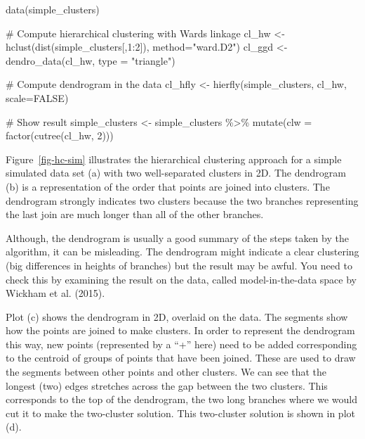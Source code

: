 \documentclass[
  letterpaper,
]{krantz}
\newenvironment{Shaded}{\begin{snugshade}}{\end{snugshade}}
\newcommand{\AttributeTok}[1]{\textcolor[rgb]{0.40,0.45,0.13}{#1}}
\newcommand{\CommentTok}[1]{\textcolor[rgb]{0.37,0.37,0.37}{#1}}
\newcommand{\ConstantTok}[1]{\textcolor[rgb]{0.56,0.35,0.01}{#1}}
\newcommand{\DecValTok}[1]{\textcolor[rgb]{0.68,0.00,0.00}{#1}}
\newcommand{\FunctionTok}[1]{\textcolor[rgb]{0.28,0.35,0.67}{#1}}
\newcommand{\NormalTok}[1]{\textcolor[rgb]{0.00,0.23,0.31}{#1}}
\newcommand{\OtherTok}[1]{\textcolor[rgb]{0.00,0.23,0.31}{#1}}
\newcommand{\SpecialCharTok}[1]{\textcolor[rgb]{0.37,0.37,0.37}{#1}}
\newcommand{\StringTok}[1]{\textcolor[rgb]{0.13,0.47,0.30}{#1}}
\begin{document}
\begin{Shaded}
\begin{Highlighting}[]
\FunctionTok{data}\NormalTok{(simple\_clusters)}

\CommentTok{\# Compute hierarchical clustering with Ward\textquotesingle{}s linkage}
\NormalTok{cl\_hw }\OtherTok{\textless{}{-}} \FunctionTok{hclust}\NormalTok{(}\FunctionTok{dist}\NormalTok{(simple\_clusters[,}\DecValTok{1}\SpecialCharTok{:}\DecValTok{2}\NormalTok{]),}
                \AttributeTok{method=}\StringTok{"ward.D2"}\NormalTok{)}
\NormalTok{cl\_ggd }\OtherTok{\textless{}{-}} \FunctionTok{dendro\_data}\NormalTok{(cl\_hw, }\AttributeTok{type =} \StringTok{"triangle"}\NormalTok{)}

\CommentTok{\# Compute dendrogram in the data}
\NormalTok{cl\_hfly }\OtherTok{\textless{}{-}} \FunctionTok{hierfly}\NormalTok{(simple\_clusters, cl\_hw, }\AttributeTok{scale=}\ConstantTok{FALSE}\NormalTok{)}

\CommentTok{\# Show result}
\NormalTok{simple\_clusters }\OtherTok{\textless{}{-}}\NormalTok{ simple\_clusters }\SpecialCharTok{\%\textgreater{}\%}
  \FunctionTok{mutate}\NormalTok{(}\AttributeTok{clw =} \FunctionTok{factor}\NormalTok{(}\FunctionTok{cutree}\NormalTok{(cl\_hw, }\DecValTok{2}\NormalTok{)))}
\end{Highlighting}
\end{Shaded}

Figure~\ref{fig-hc-sim} illustrates the hierarchical clustering approach
for a simple simulated data set (a) with two well-separated clusters in
2D. The dendrogram (b) is a representation of the order that points are
joined into clusters. The dendrogram strongly indicates two clusters
because the two branches representing the last join are much longer than
all of the other branches.

Although, the dendrogram is usually a good summary of the steps taken by
the algorithm, it can be misleading. The dendrogram might indicate a
clear clustering (big differences in heights of branches) but the result
may be awful. You need to check this by examining the result on the
data, called model-in-the-data space by Wickham et al. (2015).

Plot (c) shows the dendrogram in 2D, overlaid on the data. The segments
show how the points are joined to make clusters. In order to represent
the dendrogram this way, new points (represented by a ``+'' here) need
to be added corresponding to the centroid of groups of points that have
been joined. These are used to draw the segments between other points
and other clusters. We can see that the longest (two) edges stretches
across the gap between the two clusters. This corresponds to the top of
the dendrogram, the two long branches where we would cut it to make the
two-cluster solution. This two-cluster solution is shown in plot (d).
\end{document}
